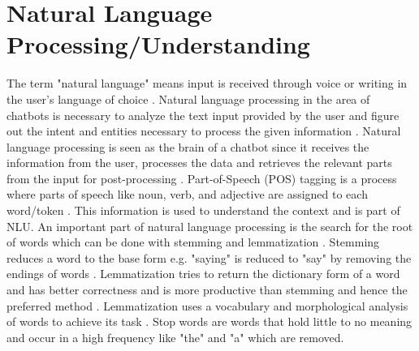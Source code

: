 \section{Natural Language Processing/Understanding}   
The term "natural language" means input is received through voice or writing in the user's language of choice \cite{buiildChatbotsPython}.
Natural language processing in the area of chatbots is necessary to analyze the text input 
provided by the user and figure out the intent and entities necessary to process the given information \cite{buiildChatbotsPython}. 
Natural language processing is seen as the brain of a chatbot since it receives the information 
from the user, processes the data and retrieves the relevant parts from the input for post-processing \cite{buiildChatbotsPython}.
Part-of-Speech (POS) tagging is a process where parts of
speech like noun, verb, and adjective are assigned to each word/token \cite{buiildChatbotsPython}.
This information is used to understand the context and is part of NLU.
An important part of natural language processing is the search for the root of words which can be done with 
stemming and lemmatization \cite{buiildChatbotsPython}.
Stemming reduces a word to the base form e.g. "saying" is reduced to "say" by removing the endings of words \cite{buiildChatbotsPython}.
Lemmatization tries to return the dictionary form of a word and has better correctness and is more
 productive than stemming and hence the preferred method \cite{buiildChatbotsPython}. 
 Lemmatization uses a vocabulary and morphological analysis of words to achieve its task \cite{buiildChatbotsPython}.
Stop words are words that hold little to no meaning and occur in a high frequency like "the" and "a" which 
are removed.




